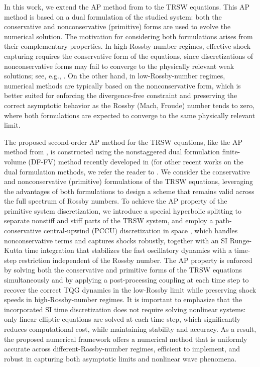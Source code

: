 \documentclass[a4paper,11pt,twoside]{article}
\numberwithin{equation}{section}
\numberwithin{figure}{section}
\numberwithin{table}{section}
\begin{document}
In this work, we extend the AP method from \cite{CKKM} to the TRSW equations. This AP method is based on a dual formulation of the studied 
system: both the conservative and nonconservative (primitive) forms are used to evolve the numerical solution. The motivation for
considering both formulations arises from their complementary properties. In high-Rossby-number regimes, effective shock capturing requires
the conservative form of the equations, since discretizations of nonconservative forms may fail to converge to the physically relevant weak
solutions; see, e.g., \cite{Abgrall_2010,Hou_1994}. On the other hand, in low-Rossby-number regimes, numerical methods are typically based
on the nonconservative form, which is better suited for enforcing the divergence-free constraint and preserving the correct asymptotic
behavior as the Rossby (Mach, Froude) number tends to zero, where both formulations are expected to converge to the same physically
relevant limit.

The proposed second-order AP method for the TRSW equations, like the AP method from \cite{CKKM}, is constructed using the nonstaggered dual 
formulation finite-volume (DF-FV) method recently developed in \cite{CFKM} (for other recent works on the dual formulation methods, we refer
the reader to \cite{Abgrall_2023,Abgrall_2024,Abgrall_2025}. We consider the conservative and nonconservative (primitive) formulations of 
the TRSW equations, leveraging the advantages of both formulations to design a scheme that remains valid across the full spectrum of Rossby 
numbers. To achieve the AP property of the primitive system discretization, we introduce a special hyperbolic splitting to separate nonstiff
and stiff parts of the TRSW system, and employ a path-conservative central-upwind (PCCU) discretization in space
\cite{CKKM,Chu_2022,Castro_2019}, which handles nonconservative terms and captures shocks robustly, together with an SI Runge-Kutta time
integration that stabilizes the fast oscillatory dynamics with a time-step restriction independent of the Rossby number. The AP property is
enforced by solving both the conservative and primitive forms of the TRSW equations simultaneously and by applying a post-processing
coupling at each time step to recover the correct TQG dynamics in the low-Rossby limit while preserving shock speeds in high-Rossby-number
regimes. It is important to emphasize that the incorporated SI time discretization does not require solving nonlinear systems: only linear
elliptic equations are solved at each time step, which significantly reduces computational cost, while maintaining stability and accuracy.
As a result, the proposed numerical framework offers a numerical method that is uniformly accurate across different-Rossby-number regimes,
efficient to implement, and robust in capturing both asymptotic limits and nonlinear wave phenomena.
\end{document}
